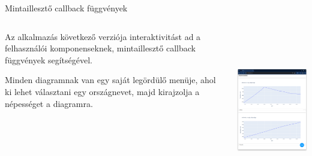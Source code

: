 \documentclass[english, aspectratio=169]{beamer}
\begin{document}
	\begin{frame}[fragile]{Mintaillesztő callback függvények}
		\begin{columns}
			\begin{column}{.5\textwidth}
				Az alkalmazás következő verziója interaktivitást ad a felhasználói komponenseknek, mintaillesztő callback függvények segítségével.\par\smallskip
				Minden diagramnak van egy saját legördülő menüje, ahol ki lehet választani egy országnevet, majd kirajzolja a népességet a diagramra. 
			\end{column}
			\begin{column}{.5\textwidth}
				\begin{center}
					\includegraphics[width=7cm, height=7cm, keepaspectratio]{images/adv_3.png}
				\end{center}
			\end{column}
		\end{columns}
	\end{frame}
	
\end{document}
